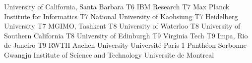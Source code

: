 \begin{multicols}{2}
{University of California, Santa Barbara}
{T6}
{}
{IBM Research}
{T7}
{}
{Max Planck Institute for Informatics}
{T7}
{}
{National University of Kaohsiung}
{T7}
{}
{Heidelberg University}
{T7}
{}
{MGIMO, Tashkent}
{T8}
{}
{University of Waterloo}
{T8}
{}
{University of Southern California}
{T8}
{}
{University of Edinburgh}
{T9}
{}
{Virginia Tech}
{T9}
{}
{Impa, Rio de Janeiro}
{T9}
{}
{RWTH Aachen University}
{}
{}
{Université Paris 1 Panthéon Sorbonne}
{}
{}
{Gwangju Institute of Science and Technology}
{}
{}
{Universite de Montreal}
{}
{}
\end{multicols}

